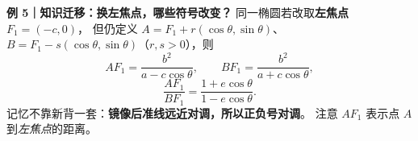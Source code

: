 \clearpage
\begin{examplebox}
\begin{center}\end{center}
\textbf{例 5｜知识迁移：换左焦点，哪些符号改变？}
同一椭圆若改取\textbf{左焦点} $F_1=(-c,0)$，
但仍定义 $A=F_1+r(\cos\theta,\sin\theta)$、
$B=F_1-s(\cos\theta,\sin\theta)$（$r,s>0$），则
\[
 \boxed{AF_1=\frac{b^2}{a-c\cos\theta}},\qquad
 \boxed{BF_1=\frac{b^2}{a+c\cos\theta}},
\]
\[
 \boxed{\frac{AF_1}{BF_1}=\frac{1+e\cos\theta}{1-e\cos\theta}}.
\]
记忆不靠新背一套：\textbf{镜像后准线远近对调，所以正负号对调}。
注意 $AF_1$ 表示点 $A$ 到\emph{左焦点}的距离。
\end{examplebox}
